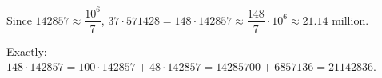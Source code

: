 Since $142857\approx\dfrac{10^6}{7}$, $37\cdot571428=148\cdot142857\approx\dfrac{148}{7}\cdot10^6\approx21.14$ million.

Exactly: $148\cdot142857=100\cdot142857+48\cdot142857=14285700+6857136=\boxed{21142836}$.
